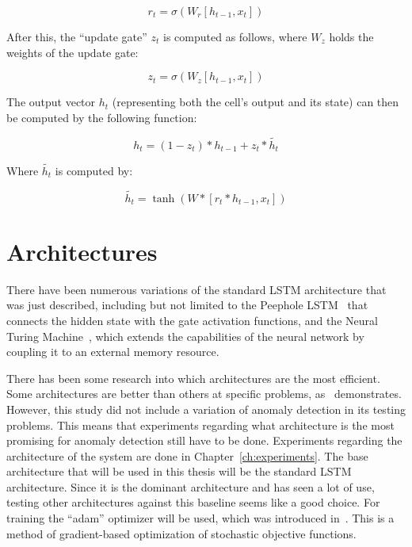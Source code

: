 \begin{equation} \label{eq:gru_reset_gate}
r_t = \sigma(W_r [h_{t-1}, x_t])
\end{equation}

After this, the \enquote{update gate} \(z_t\) is computed as follows, where \(W_z\) holds the weights of the update gate:

\begin{equation} \label{eq:gru_update_gate}
z_t = \sigma(W_z [h_{t-1}, x_t])
\end{equation}

The output vector \(h_t\) (representing both the cell's output and its state) can then be computed by the following function:

\begin{equation} \label{eq:gru_output}
h_t = (1 - z_t) * h_{t-1} + z_t * \tilde{h_t}
\end{equation}

Where \(\tilde{h_t}\) is computed by:

\begin{equation} \label{eq:gru_output_partial}
\tilde{h_t} = \tanh(W * [r_t * h_{t-1}, x_t])
\end{equation}

\section{Architectures}

There have been numerous variations of the standard LSTM architecture that was just described, including but not limited to the Peephole LSTM~\cite{gers2002learning} that connects the hidden state with the gate activation functions, and the Neural Turing Machine~\cite{graves2014neural}, which extends the capabilities of the neural network by coupling it to an external memory resource.

There has been some research into which architectures are the most efficient. Some architectures are better than others at specific problems, as~\cite{jozefowicz2015empirical} demonstrates. However, this study did not include a variation of anomaly detection in its testing problems. This means that experiments regarding what architecture is the most promising for anomaly detection still have to be done. Experiments regarding the architecture of the system are done in Chapter~\ref{ch:experiments}. The base architecture that will be used in this thesis will be the standard LSTM architecture. Since it is the dominant architecture and has seen a lot of use, testing other architectures against this baseline seems like a good choice. For training the \enquote{adam} optimizer will be used, which was introduced in~\cite{kingma2014adam}. This is a method of gradient-based optimization of stochastic objective functions.